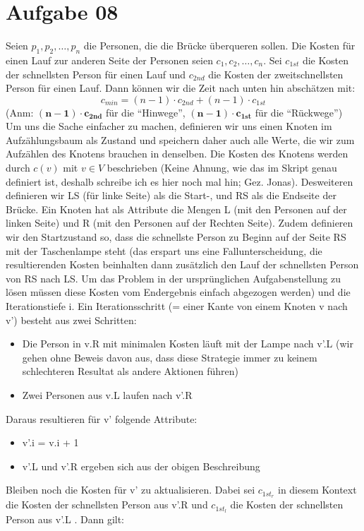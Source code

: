 \documentclass[10pt,a4paper]{article}
\begin{document}
\section*{Aufgabe 08}
    Seien ${p_1, p_2, \ldots, p_n}$ die Personen, die die Br\"ucke \"uberqueren
    sollen. Die Kosten f\"ur einen Lauf zur anderen Seite der Personen seien
    $c_1, c_2, \ldots, c_n$. Sei $c_{1st}$ die Kosten der schnellsten Person
    f\"ur einen Lauf und $c_{2nd}$ die Kosten der zweitschnellsten Person
    f\"ur einen Lauf. Dann k\"onnen wir die Zeit nach unten hin absch\"atzen mit:
    $$
        c_{min} = (n-1) \cdot c_{2nd} + (n-1) \cdot c_{1st}
    $$
    (Anm: $\mathbf{(n-1) \cdot c_{2nd}}$ f\"ur die ``Hinwege'',
    $\mathbf{(n-1) \cdot c_{1st}}$ f\"ur die ``R\"uckwege'') \\
    Um uns die Sache einfacher zu machen, definieren wir uns einen Knoten
    im Aufz\"ahlungsbaum als Zustand und speichern daher auch alle
    Werte, die wir zum Aufz\"ahlen des Knotens brauchen in denselben.
    Die Kosten des Knotens werden durch $c(v)$ mit $v \in V$ beschrieben
    (Keine Ahnung, wie das im Skript genau definiert ist, deshalb schreibe ich
    es hier noch mal hin; Gez. Jonas).
    Desweiteren definieren wir LS (f\"ur linke Seite) als die Start-,
    und RS als die Endseite der Br\"ucke.
    Ein Knoten hat als Attribute die Mengen L (mit den Personen auf der
    linken Seite) und R (mit den Personen auf der Rechten Seite).
    Zudem definieren wir den Startzustand so, dass die schnellste Person
    zu Beginn auf der Seite RS mit der Taschenlampe steht (das erspart
    uns eine Fallunterscheidung, die resultierenden Kosten beinhalten dann zusätzlich
    den Lauf der schnellsten Person von RS nach LS. Um das Problem in der ursprünglichen
    Aufgabenstellung zu lösen müssen diese Kosten vom Endergebnis einfach abgezogen werden)
    und die Iterationstiefe i. Ein Iterationsschritt (= einer Kante von einem
    Knoten v nach v') besteht aus zwei Schritten:
    \begin{itemize}
        \item Die Person in v.R mit minimalen Kosten l\"auft mit der Lampe nach
              v'.L (wir gehen ohne Beweis davon aus, dass diese Strategie immer
              zu keinem schlechteren Resultat als andere Aktionen f\"uhren)
        \item Zwei Personen aus v.L laufen nach v'.R
    \end{itemize}
    Daraus resultieren f\"ur v' folgende Attribute:
    \begin{itemize}
        \item v'.i = v.i + 1
        \item v'.L und v'.R ergeben sich aus der obigen Beschreibung
    \end{itemize}
    Bleiben noch die Kosten f\"ur v' zu aktualisieren. Dabei sei $c_{1st_r}$ in diesem
    Kontext die Kosten der schnellsten Person aus v'.R und $c_{1st_l}$ die Kosten
    der schnellsten Person aus v'.L . Dann gilt:
\end{document}
